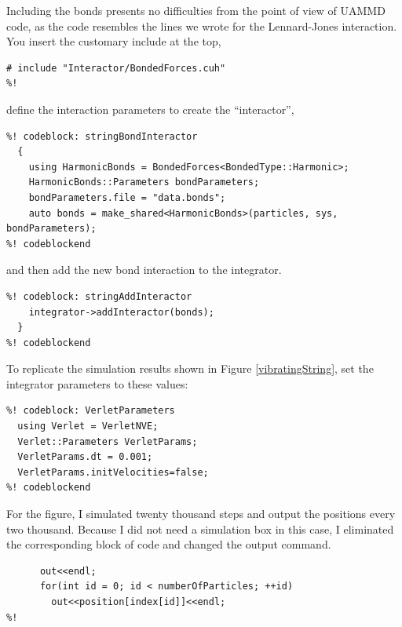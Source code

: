 Including the bonds presents no difficulties from the point of view of UAMMD
code, as the code resembles the lines we wrote for the Lennard-Jones
interaction. You insert the customary include at the top,
\begin{lstlisting}
# include "Interactor/BondedForces.cuh"
%!
\end{lstlisting}
define the interaction parameters to create the ``interactor'',
\begin{lstlisting}
%! codeblock: stringBondInteractor
  {
    using HarmonicBonds = BondedForces<BondedType::Harmonic>;
    HarmonicBonds::Parameters bondParameters;
    bondParameters.file = "data.bonds";
    auto bonds = make_shared<HarmonicBonds>(particles, sys, bondParameters);
%! codeblockend
\end{lstlisting}
and then add the new bond interaction to the integrator.
\begin{lstlisting}
%! codeblock: stringAddInteractor
    integrator->addInteractor(bonds);
  }
%! codeblockend
\end{lstlisting}

To replicate the simulation results shown in Figure \ref{vibratingString},
set the integrator parameters to these values:
\begin{lstlisting}
%! codeblock: VerletParameters
  using Verlet = VerletNVE;
  Verlet::Parameters VerletParams;
  VerletParams.dt = 0.001;
  VerletParams.initVelocities=false;
%! codeblockend
\end{lstlisting}
For the figure, I simulated twenty thousand steps and output the positions every
two thousand. Because I did not need a simulation box in this case, I eliminated
the corresponding block of code and changed the output command.
\begin{lstlisting}
      out<<endl;
      for(int id = 0; id < numberOfParticles; ++id)
        out<<position[index[id]]<<endl;
%!
\end{lstlisting}

